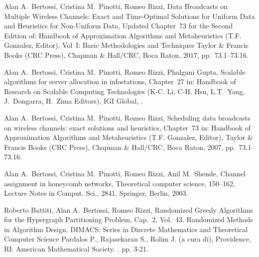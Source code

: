 
\begin{etaremune}
\vspace{-3.0mm}

  \item {\sc Alan A.~Bertossi, Cristina M.~Pinotti, Romeo Rizzi},
   \newblock  Data Broadcasts on Multiple Wireless Channels:
Exact and Time-Optimal Solutions for Uniform Data
and Heuristics for Non-Uniform Data,
   \newblock  Updated Chapter~73 for the Second Edition of:
               Handbook of Approximation Algorithms and Metaheuristics
   \newblock (T.F. Gonzalez, Editor),
   \newblock Vol~I: Basic Methodologies and Techniques
   \newblock  Taylor \& Francis Books (CRC Press),
   \newblock Chapman \& Hall/CRC, Boca Raton, 2017, pp.~73.1--73.16.

  \item {\sc Alan A.~Bertossi, Cristina M.~Pinotti, Romeo Rizzi, Phalguni Gupta},
   \newblock  Scalable algorithms for server allocation in infostations,
   \newblock  Chapter~27 in:
               Handbook of Research on Scalable Computing Technologies
   \newblock (K-C. Li, C-H. Hsu, L.T.~Yang, J.~Dongarra, H.~Zima Editors),
   \newblock  IGI Global,
   .

  \item {\sc Alan A.~Bertossi, Cristina M.~Pinotti, Romeo Rizzi},
   \newblock  Scheduling data broadcasts on wireless channels:
               exact solutions and heuristics,
   \newblock  Chapter~73 in:
               Handbook of Approximation Algorithms and Metaheuristics
   \newblock (T.F. Gonzalez, Editor),
   \newblock  Taylor \& Francis Books (CRC Press),
   \newblock Chapman \& Hall/CRC, Boca Raton, 2007, pp.~73.1--73.16.

  \item {\sc Alan A.~Bertossi, Cristina M.~Pinotti, Romeo Rizzi, Anil M.~Shende},
   \newblock  Channel assignment in honeycomb networks,
   \newblock Theoretical computer science,  150--162,
   \newblock Lecture Notes in Comput. Sci., 2841,
   \newblock Springer, Berlin, 2003.

  \item {\sc Roberto Battiti, Alan A.~Bertossi, Romeo Rizzi},  
   \newblock  Randomized Greedy Algorithms 
              for the Hypergraph Partitioning Problem,
   \newblock Cap.~2, Vol.~43.
   \newblock Randomized Methods in Algorithm Design.
   \newblock DIMACS: Series in Discrete Mathematics
             and Theoretical Computer Science
   \newblock Pardalos P., Rajasekaran S., Rolim J. (a cura di),
             Providence, RI: American Mathematical Society.
   . pp. 3-21.

\end{etaremune}
